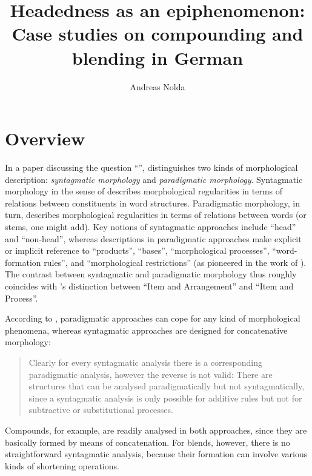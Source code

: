 \documentclass[output=paper
  ,nobabel
  ,draftmode
  ,colorlinks, citecolor=brown
]{langscibook}
\title[Headedness as an epiphenomenon]{Headedness as an epiphenomenon: Case studies on compounding
  and blending in German}
\author{Andreas Nolda\orcid{0000-0003-4532-8256}\affiliation{Berlin-Brandenburg Academy of Sciences and Humanities}}
\begin{document}
\maketitle

\section{Overview}
In a paper discussing the question ``'', \citet[5–8]{becker:1990:word:heads}
distinguishes two kinds of morphological description: \emph{syntagmatic
morphology} and \emph{paradigmatic morphology}. Syntagmatic
morphology in the sense of \citet{becker:1990:word:heads}
describes morphological regularities in terms of relations between constituents
in word structures. Paradigmatic morphology, in turn, describes morphological
regularities in terms of relations between words (or stems, one might add). Key
notions of syntagmatic approaches include ``head'' and
``non-head'', whereas descriptions in paradigmatic approaches
make explicit or implicit reference to ``products'',
``bases'', ``morphological processes'',
``word-formation rules'', and ``morphological
restrictions'' (as pioneered in the work of \citealt{aronoff:1976:word:formation}). The contrast between syntagmatic and
paradigmatic morphology thus roughly coincides with \citeauthor{hockett:1954:two:models}’s \citeyearpar{hockett:1954:two:models} distinction between ``Item and
Arrangement'' and ``Item and Process''.

According to \citet[6]{becker:1990:word:heads},
paradigmatic approaches can cope for any kind of morphological phenomena,
whereas syntagmatic approaches are designed for concatenative morphology:
\begin{quotation}
Clearly for every syntagmatic analysis there is a
corresponding paradigmatic analysis, however the reverse is not valid: There are
structures that can be analysed paradigmatically but not syntagmatically, since
a syntagmatic analysis is only possible for additive rules but not for
subtractive or substitutional processes.
\end{quotation} Compounds, for example, are
readily analysed in both approaches, since they are basically formed by means of
concatenation. For blends, however, there is no straightforward syntagmatic
analysis, because their formation can involve various kinds of shortening
operations.
\end{document}
